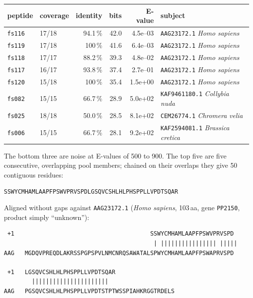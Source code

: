 \documentclass[11pt,a4paper]{article}
\begin{document}
\begin{center}
\footnotesize
\begin{tabular}{llrrrl}
\toprule
peptide & coverage & identity & bits & E-value & subject \\
\midrule
\texttt{fs116} & 17/18 & 94.1\,\% & 42.0 & 4.5e--03 & \texttt{AAG23172.1} \emph{Homo sapiens} \\
\texttt{fs119} & 17/18 & 100\,\% & 41.6 & 6.4e--03 & \texttt{AAG23172.1} \emph{Homo sapiens} \\
\texttt{fs118} & 17/17 & 88.2\,\% & 39.3 & 4.8e--02 & \texttt{AAG23172.1} \emph{Homo sapiens} \\
\texttt{fs117} & 16/17 & 93.8\,\% & 37.4 & 2.7e--01 & \texttt{AAG23172.1} \emph{Homo sapiens} \\
\texttt{fs120} & 15/18 & 100\,\% & 35.4 & 1.5e+00 & \texttt{AAG23172.1} \emph{Homo sapiens} \\
\midrule
\texttt{fs082} & 15/15 & 66.7\,\% & 28.9 & 5.0e+02 & \texttt{KAF9461180.1} \emph{Collybia nuda} \\
\texttt{fs025} & 18/18 & 50.0\,\% & 28.5 & 8.1e+02 & \texttt{CEM26774.1} \emph{Chromera velia} \\
\texttt{fs006} & 15/15 & 66.7\,\% & 28.1 & 9.2e+02 & \texttt{KAF2594081.1} \emph{Brassica cretica} \\
\bottomrule
\end{tabular}
\end{center}

The bottom three are noise at E-values of 500 to 900. The top five are five
consecutive, overlapping pool members; chained on their overlaps they give 50
contiguous residues:

\begin{center}
\texttt{SSWYCMHAMLAAPFPSWVPRVSPDLGSQVCSHLHLPHSPPLLVPDTSQAR}
\end{center}

Aligned without gaps against \texttt{AAG23172.1} (\emph{Homo sapiens},
103\,aa, gene \texttt{PP2150}, product simply ``unknown''):

\begin{lstlisting}
 +1                                       SSWYCMHAMLAAPFPSWVPRVSPD
                                           | |||||||||||||||| |||||
AAG   MGDQVPREQDLAKRSSPGPSPVLNMCNRQSAWATALSPWYCMHAMLAAPFPSWAPRVSPD

 +1   LGSQVCSHLHLPHSPPLLVPDTSQAR
        ||||||||||||||||||||||
AAG   PGSQVCSHLHLPHSPPLLVPDTSTPTWSSPIAHKRGGTRDELS
\end{lstlisting}
\end{document}
